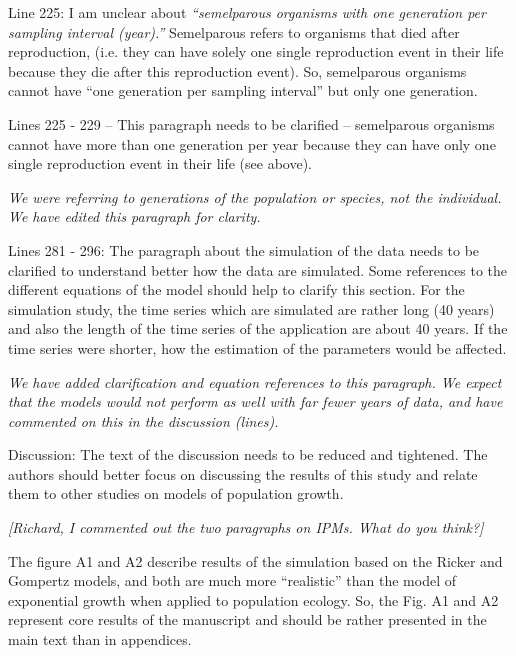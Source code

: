 \documentclass[12pt,english]{article}
\begin{document}
\begin{spacing}{1.9}
\begin{flushleft}
Line 225: I am unclear about \textit{``semelparous organisms with one generation per sampling
interval (year).''} Semelparous refers to organisms that died after reproduction, (i.e. they can
have solely one single reproduction event in their life because they die after this
reproduction event). So, semelparous organisms cannot have ``one generation per sampling
interval'' but only one generation.

Lines 225 - 229 – This paragraph needs to be clarified – semelparous organisms cannot have
more than one generation per year because they can have only one single reproduction
event in their life (see above).

\vspace{0.5cm}
\textit{We were referring to generations of the population or species, not the individual.  We have edited 
this paragraph for clarity.}
\vspace{0.5cm}

Lines 281 - 296: The paragraph about the simulation of the data needs to be clarified to
understand better how the data are simulated. Some references to the different equations
of the model should help to clarify this section. For the simulation study, the time series
which are simulated are rather long (40 years) and also the length of the time series of the
application are about 40 years. If the time series were shorter, how the estimation of the
parameters would be affected.

\vspace{0.5cm}
\textit{We have added clarification and equation references to this paragraph. We expect that
the models would not perform as well with far fewer years of data, and have commented on
this in the discussion (lines).}
\vspace{0.5cm}

Discussion: The text of the discussion needs to be reduced and tightened. The authors
should better focus on discussing the results of this study and relate them to other studies
on models of population growth.

\vspace{0.5cm}
\textit{[Richard, I commented out the two paragraphs on IPMs.  What do you think?]}
\vspace{0.5cm}

The figure A1 and A2 describe results of the simulation based on the Ricker and Gompertz
models, and both are much more ``realistic'' than the model of exponential growth when
applied to population ecology. So, the Fig. A1 and A2 represent core results of the
manuscript and should be rather presented in the main text than in appendices.


\end{flushleft}
\end{spacing}
\end{document}
